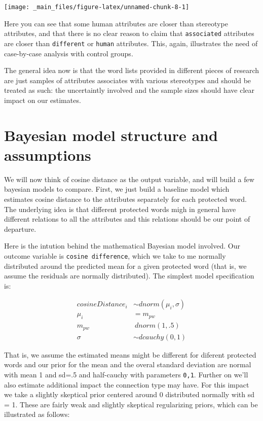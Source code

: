 \documentclass[
  12pt,
]{book}
\begin{document}
\begin{center}\texttt{[image: \_main\_files/figure-latex/unnamed-chunk-8-1]} \end{center}
\normalsize

\noindent Here you can see that some human attributes are closer than stereotype attributes, and that there is no clear reason to claim that \texttt{associated} attributes are closer than \texttt{different} or \texttt{human} attributes. This, again, illustrates the need of case-by-case analysis with control groups.

The general idea now is that the word lists provided in different pieces of research are just samples of attributes associates with various stereotypes and should be treated as such: the uncertaintly involved and the sample sizes should have clear impact on our estimates.

\hypertarget{bayesian-model-structure-and-assumptions}{%
\section{Bayesian model structure and assumptions}\label{bayesian-model-structure-and-assumptions}}

We will now think of cosine distance as the output variable, and
will build a few bayesian models to compare. First, we just build a baseline model which estimates cosine distance to the attributes separately for each protected word. The underlying idea is that different protected words migh in general have different relations to all the attributes and this relations should be our point of departure.

Here is the intution behind the mathematical Bayesian model involved. Our outcome variable is \texttt{cosine\ difference}, which we take to me normally distributed around the predicted mean for a given protected word (that is, we assume the residuals are normally distributed). The simplest model specification is:

\begin{align}
cosineDistance_i  & \sim dnorm(\mu_i, \sigma) \\
\mu_i & = m_{pw} \\
m_{pw} & ~ dnorm(1,.5) \\
\sigma &\sim  dcauchy(0,1)
\end{align}

That is, we assume the estimated means might be different for diferent protected words and our prior for the mean and the overal standard deviation are normal with mean 1 and sd=.5 and half-cauchy with parameters \texttt{0,1}. Further on we'll also estimate additional impact the connection type may have. For this impact we take a slightly skeptical prior centered around 0 distributed normally with sd = 1. These are fairly weak and slightly skeptical regularizing priors, which can be illustrated as follows:
\end{document}
